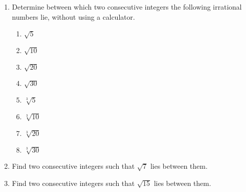\begin{eocexercises}{}
\begin{enumerate}[itemsep=5pt, label=\textbf{\arabic*}. ]
\item Determine between which two consecutive integers the following irrational numbers lie, without using a calculator.
\begin{multicols}{2}
    \begin{enumerate}[itemsep=5pt, label=\textbf{(\alph*)} ] 
    \item $\sqrt{5}$ 
    \item $\sqrt{10}$ 
    \item $\sqrt{20}$ 
    \item $\sqrt{30}$ 
    \item $\sqrt[3]{5}$ 
    \item $\sqrt[3]{10}$ 
    \item $\sqrt[3]{20}$ 
    \item $\sqrt[3]{30}$ 
    \end{enumerate}
\end{multicols}

\item  Find two consecutive integers such that $\sqrt{7}$ lies between them.          
\item  Find two consecutive integers such that $\sqrt{15}$ lies between them.          





\end{enumerate}
\end{eocexercises}
